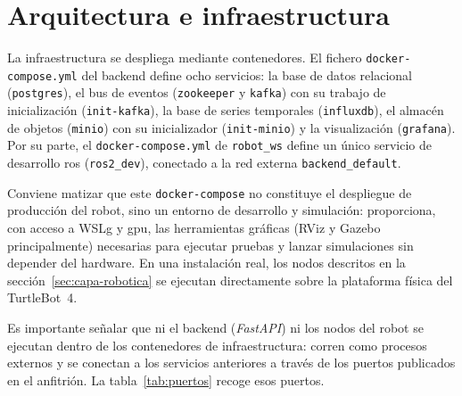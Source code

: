 \section{Arquitectura e infraestructura}
\label{sec:infraestructura}

La infraestructura se despliega mediante contenedores. El fichero
\texttt{docker-compose.yml} del backend define ocho servicios: la base de datos
relacional (\texttt{postgres}), el bus de eventos (\texttt{zookeeper} y
\texttt{kafka}) con su trabajo de inicialización (\texttt{init-kafka}), la base de
series temporales (\texttt{influxdb}), el almacén de objetos (\texttt{minio}) con
su inicializador (\texttt{init-minio}) y la visualización (\texttt{grafana}). Por
su parte, el \texttt{docker-compose.yml} de \texttt{robot\_ws} define un único servicio de
desarrollo \gls{ros} (\texttt{ros2\_dev}), conectado a la red externa
\texttt{backend\_default}.

Conviene matizar que este \texttt{docker-compose} no constituye el despliegue de
producción del robot, sino un entorno de desarrollo y simulación: proporciona, con
acceso a WSLg y \acrshort{gpu}, las herramientas gráficas (RViz y Gazebo principalmente) necesarias
para ejecutar pruebas y lanzar simulaciones sin depender del hardware. En una
instalación real, los nodos descritos en la sección~\ref{sec:capa-robotica} se
ejecutan directamente sobre la plataforma física del TurtleBot~4.

Es importante señalar que ni el backend (\textit{FastAPI}) ni los nodos del robot
se ejecutan dentro de los contenedores de infraestructura: corren como procesos
externos y se conectan a los servicios anteriores a través de los puertos
publicados en el anfitrión. La tabla~\ref{tab:puertos} recoge esos puertos.

